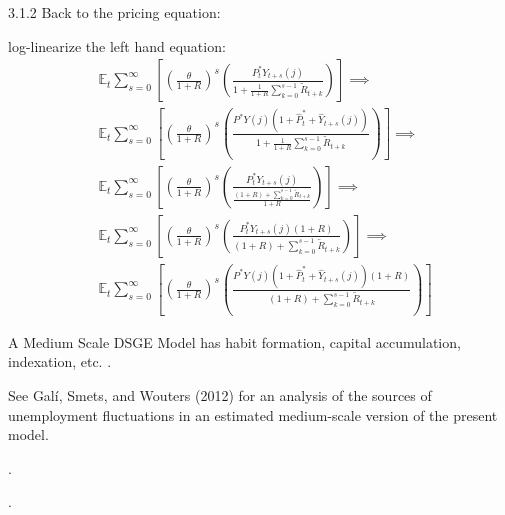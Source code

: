 \documentclass[
thesis.tex
]{subfiles}
\begin{document}
\begin{definition}
	
	\cite[Lecture 13, p.7]{solis-garcia_ucb_2022}
	
	3.1.2 Back to the pricing equation:
	
	log-linearize the left hand equation:
	\begin{align*}
		&\mathbb{E}_t \sum_{s=0}^{\infty} 
		\left[ 
		\left( \frac{\theta}{1+R} \right)^s
		\left( \frac{P_t^\ast Y_{t+s}(j)}{1 + \frac{1}{1+R}
			\sum_{k=0}^{s-1} \widetilde{R}_{t+k}} \right) 
		\right]
		\implies \\
		&\mathbb{E}_t \sum_{s=0}^{\infty} 
		\left[ 
		\left( \frac{\theta}{1+R} \right)^s
		\left( \frac{P^\ast Y(j)(1+\widehat{P}_t^\ast + \widehat{Y}_{t+s}(j))}{1 + \frac{1}{1+R}
			\sum_{k=0}^{s-1} \widetilde{R}_{t+k}} \right) 
		\right] \implies \\
		&\mathbb{E}_t \sum_{s=0}^{\infty} 
		\left[ 
		\left( \frac{\theta}{1+R} \right)^s
		\left( \frac{P_t^\ast Y_{t+s}(j)}{\frac{(1+R)+\sum_{k=0}^{s-1} \widetilde{R}_{t+k}}{1+R}} \right) 
		\right]
		\implies \\
		&\mathbb{E}_t \sum_{s=0}^{\infty} 
		\left[ 
		\left( \frac{\theta}{1+R} \right)^s
		\left( \frac{P_t^\ast Y_{t+s}(j)(1+R)}{(1+R)+\sum_{k=0}^{s-1} \widetilde{R}_{t+k}} \right) 
		\right]
		\implies \\
		&\mathbb{E}_t \sum_{s=0}^{\infty} 
		\left[ 
		\left( \frac{\theta}{1+R} \right)^s
		\left( \frac{P^\ast Y(j)(1+\widehat{P}_t^\ast + \widehat{Y}_{t+s}(j))(1+R)}{(1+R)+\sum_{k=0}^{s-1} \widetilde{R}_{t+k}} \right) 
		\right]
	\end{align*}
	
\end{definition}

\begin{definition}
	A Medium Scale DSGE Model has habit formation, capital accumulation, indexation, etc. \cite[p.208]{gali_monetary_2015}. 
	
	See Galí, Smets, and Wouters (2012) for an analysis of the sources of unemployment fluctuations in an estimated medium-scale version of the present model.
\end{definition}

\begin{definition}
	\cite[Lecture 5, p.3]{solis-garcia_ucb_2022}.
\end{definition}

\begin{definition}
	\cite[Lecture 5, p.4]{solis-garcia_ucb_2022}.
\end{definition}
\end{document}
